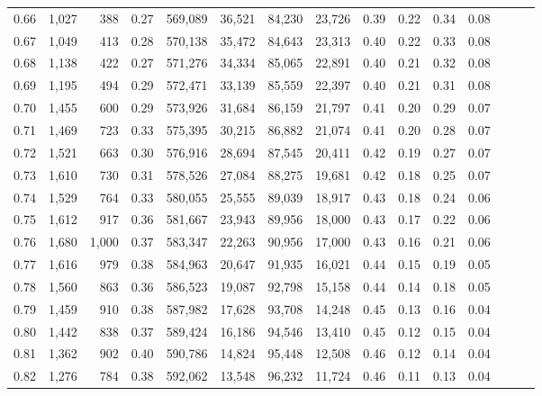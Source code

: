 \begin{tabular}{rrrrrrrrrrrrrrr}
0.66 &   1,027 &    388 &  0.27 &  569,089 &   36,521 &   84,230 &   23,726 &  0.39 &  0.22 &  0.34 &      0.08 \\
0.67 &   1,049 &    413 &  0.28 &  570,138 &   35,472 &   84,643 &   23,313 &  0.40 &  0.22 &  0.33 &      0.08 \\
0.68 &   1,138 &    422 &  0.27 &  571,276 &   34,334 &   85,065 &   22,891 &  0.40 &  0.21 &  0.32 &      0.08 \\
0.69 &   1,195 &    494 &  0.29 &  572,471 &   33,139 &   85,559 &   22,397 &  0.40 &  0.21 &  0.31 &      0.08 \\
0.70 &   1,455 &    600 &  0.29 &  573,926 &   31,684 &   86,159 &   21,797 &  0.41 &  0.20 &  0.29 &      0.07 \\
0.71 &   1,469 &    723 &  0.33 &  575,395 &   30,215 &   86,882 &   21,074 &  0.41 &  0.20 &  0.28 &      0.07 \\
0.72 &   1,521 &    663 &  0.30 &  576,916 &   28,694 &   87,545 &   20,411 &  0.42 &  0.19 &  0.27 &      0.07 \\
0.73 &   1,610 &    730 &  0.31 &  578,526 &   27,084 &   88,275 &   19,681 &  0.42 &  0.18 &  0.25 &      0.07 \\
0.74 &   1,529 &    764 &  0.33 &  580,055 &   25,555 &   89,039 &   18,917 &  0.43 &  0.18 &  0.24 &      0.06 \\
0.75 &   1,612 &    917 &  0.36 &  581,667 &   23,943 &   89,956 &   18,000 &  0.43 &  0.17 &  0.22 &      0.06 \\
0.76 &   1,680 &  1,000 &  0.37 &  583,347 &   22,263 &   90,956 &   17,000 &  0.43 &  0.16 &  0.21 &      0.06 \\
0.77 &   1,616 &    979 &  0.38 &  584,963 &   20,647 &   91,935 &   16,021 &  0.44 &  0.15 &  0.19 &      0.05 \\
0.78 &   1,560 &    863 &  0.36 &  586,523 &   19,087 &   92,798 &   15,158 &  0.44 &  0.14 &  0.18 &      0.05 \\
0.79 &   1,459 &    910 &  0.38 &  587,982 &   17,628 &   93,708 &   14,248 &  0.45 &  0.13 &  0.16 &      0.04 \\
0.80 &   1,442 &    838 &  0.37 &  589,424 &   16,186 &   94,546 &   13,410 &  0.45 &  0.12 &  0.15 &      0.04 \\
0.81 &   1,362 &    902 &  0.40 &  590,786 &   14,824 &   95,448 &   12,508 &  0.46 &  0.12 &  0.14 &      0.04 \\
0.82 &   1,276 &    784 &  0.38 &  592,062 &   13,548 &   96,232 &   11,724 &  0.46 &  0.11 &  0.13 &      0.04 \\

\end{tabular}

